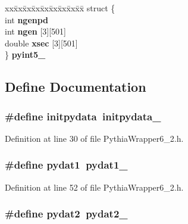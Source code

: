 \begin{CompactItemize}
\begin{tabbing}
\end{tabbing}\item 
\begin{tabbing}
xx\=xx\=xx\=xx\=xx\=xx\=xx\=xx\=xx\=\kill
struct \{\\
\>int {\bf ngenpd}\\
\>int {\bf ngen} [3][501]\\
\>double {\bf xsec} [3][501]\\
\} {\bf pyint5\_}\\

\end{tabbing}\end{CompactItemize}


\subsection{Define Documentation}
\subsubsection{\setlength{\rightskip}{0pt plus 5cm}\#define initpydata~initpydata\_\-}\label{PythiaWrapper6__2_8h_8f6480836f44533427a09e5f8f4150ad}




Definition at line 30 of file Pythia\-Wrapper6\_\-2.h.
\subsubsection{\setlength{\rightskip}{0pt plus 5cm}\#define pydat1~{\bf pydat1\_\-}}\label{PythiaWrapper6__2_8h_3ac349aace72ee0475915601b813a720}




Definition at line 52 of file Pythia\-Wrapper6\_\-2.h.
\subsubsection{\setlength{\rightskip}{0pt plus 5cm}\#define pydat2~{\bf pydat2\_\-}}\label{PythiaWrapper6__2_8h_4e4dd91838a9d45290e795630c1a4e01}




